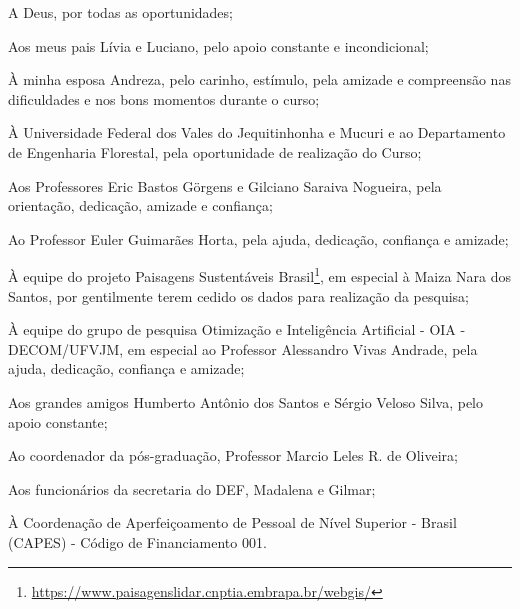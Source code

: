 \documentclass[
	12pt,				%
	openright,			%
	twoside,			%
	a4paper,			%
	chapter=TITLE,		%
	sumario=abnt-6027-2012,
	english,			%
	brazil				%
	]{UFVJM-abntex2}
\begin{document}


\begin{resumo}[agradecimentos]
\setlength{\parskip}{\onelineskip}  %

\noindent A Deus, por todas as oportunidades;

 \noindent Aos meus pais Lívia e Luciano, pelo apoio constante e incondicional;

\noindent À minha esposa Andreza, pelo carinho, estímulo, pela amizade e compreensão nas dificuldades e nos bons momentos durante o curso;

 \noindent À Universidade Federal dos Vales do Jequitinhonha e Mucuri e ao Departamento de Engenharia Florestal, pela oportunidade de realização do Curso;

\noindent Aos Professores Eric Bastos Görgens e Gilciano Saraiva Nogueira, pela orientação, dedicação, amizade e confiança;

\noindent Ao Professor Euler Guimarães Horta, pela ajuda, dedicação, confiança e amizade;

\noindent À equipe do projeto Paisagens Sustentáveis Brasil\footnote{\url{https://www.paisagenslidar.cnptia.embrapa.br/webgis/}}, em especial à Maiza Nara dos Santos, por gentilmente terem cedido os dados para realização da pesquisa;

\noindent À equipe do grupo de pesquisa Otimização e Inteligência Artificial - OIA - DECOM/UFVJM, em especial ao Professor Alessandro Vivas Andrade,  pela ajuda, dedicação, confiança e amizade;

\noindent Aos grandes amigos Humberto Antônio dos Santos e Sérgio Veloso Silva, pelo apoio constante;

\noindent Ao coordenador da pós-graduação, Professor Marcio Leles R. de Oliveira;

\noindent Aos funcionários da secretaria do DEF, Madalena e Gilmar;

\noindent À Coordenação de Aperfeiçoamento de Pessoal de Nível Superior - Brasil (CAPES) - Código de Financiamento 001.

\setlength{\parskip}{0.cm}  %
\end{resumo}
\end{document}
